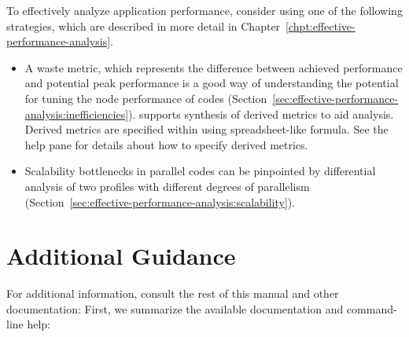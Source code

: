 \documentclass[11pt,twoside,letterpaper]{report}
\begin{document}
To effectively analyze application performance, consider using one of the following strategies, which are described in more detail in Chapter~\ref{chpt:effective-performance-analysis}.
\begin{itemize}
\item
A waste metric, which represents the difference between achieved performance and potential peak performance is a good way of understanding the potential for tuning the node performance of codes (Section~\ref{sec:effective-performance-analysis:inefficiencies}).
\hpcviewer{} supports synthesis of derived metrics to aid analysis.
Derived metrics are specified within \hpcviewer{} using spreadsheet-like formula.
See the \hpcviewer{} help pane for details about how to specify derived metrics.

\item
Scalability bottlenecks in parallel codes can be pinpointed by differential analysis of two profiles with different degrees of parallelism (Section~\ref{sec:effective-performance-analysis:scalability}).

\end{itemize}



\section{Additional Guidance}

For additional information, consult the rest of this manual and other documentation:
First, we summarize the available documentation and command-line help:
\end{document}
